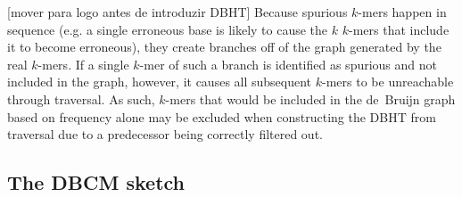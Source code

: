 \documentclass[a4paper,12pt]{article}
\newcommand{\dB}{de~Bruijn\xspace}
\newcommand{\dBG}{de~Bruijn graph\xspace}
\newcommand{\dBCM}{DBCM\xspace}
\newcommand{\dBHT}{DBHT\xspace}
\newcommand{\cm}{CountMin\xspace}
\newcommand{\kmer}{\mbox{$k$-mer}\xspace}
\newcommand{\keyterm}[1]{\textit{#1}\/\xspace}
\newcommand{\strsetname}[1]{\ensuremath{\mathcal{\uppercase{#1}}}}
\newcommand{\todo}[2][]{\color{red} [#1] #2 \color{black}}
\newcommand{\readset}{\strsetname{X}\xspace}
\begin{document}
\todo[mover para logo antes de introduzir DBHT]{Because spurious \kmer{s} happen in sequence (e.g. a single erroneous base is likely to cause the $k$ \kmer{s} that include it to become erroneous), they create branches off of the graph generated by the real \kmer{s}. If a single \kmer of such a branch is identified as spurious and not included in the graph, however, it causes all subsequent \kmer{s} to be unreachable through traversal. As such, \kmer{s} that would be included in the \dBG based on frequency alone may be excluded when constructing the \dBHT from traversal due to a predecessor being correctly filtered out.}



\subsection{The \dBCM sketch}
\label{sec:debruijncountmin}



\end{document}
